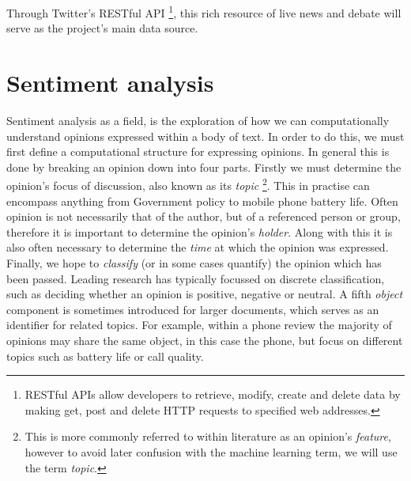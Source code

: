 Through Twitter's RESTful API \footnote{RESTful APIs allow developers to retrieve, modify, create and delete data by making get, post and delete HTTP requests to specified web addresses.}, this rich resource of live news and debate will serve as the project's main data source.

\section{Sentiment analysis}
\label{background:sentiment_analysis}

Sentiment analysis as a field, is the exploration of how we can computationally understand opinions expressed within a body of text. In order to do this, we must first define a computational structure for expressing opinions. In general \cite{Liu:2010tm} this is done by breaking an opinion down into four parts. Firstly we must determine the opinion's focus of discussion, also known as its \emph{topic} \footnote{This is more commonly referred to within literature as an opinion's \emph{feature}, however to avoid later confusion with the machine learning term, we will use the term \emph{topic}.}. This in practise can encompass anything from Government policy to mobile phone battery life. Often opinion is not necessarily that of the author, but of a referenced person or group, therefore it is important to determine the opinion's \emph{holder}. Along with this it is also often necessary to determine the \emph{time} at which the opinion was expressed. Finally, we hope to \emph{classify} (or in some cases quantify) the opinion which has been passed. Leading research \cite{Pang:2002tu,Turney:2002vv} has typically focussed on discrete classification, such as deciding whether an opinion is positive, negative or neutral. A fifth \emph{object} component is sometimes introduced for larger documents, which serves as an identifier for related topics. For example, within a phone review the majority of opinions may share the same object, in this case the phone, but focus on different topics such as battery life or call quality. 

